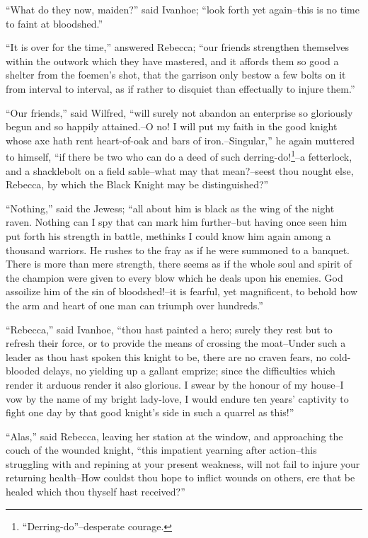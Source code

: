 ``What do they now, maiden?'' said Ivanhoe; ``look forth yet again--this
is no time to faint at bloodshed.''

``It is over for the time,'' answered Rebecca; ``our friends strengthen
themselves within the outwork which they have mastered, and it affords
them so good a shelter from the foemen's shot, that the garrison only
bestow a few bolts on it from interval to interval, as if rather to
disquiet than effectually to injure them.''

``Our friends,'' said Wilfred, ``will surely not abandon an enterprise
so gloriously begun and so happily attained.--O no! I will put my faith
in the good knight whose axe hath rent heart-of-oak and bars of
iron.--Singular,'' he again muttered to himself, ``if there be two who
can do a deed of such derring-do!\footnote{``Derring-do''--desperate
courage.}--a fetterlock, and a
shacklebolt on a field sable--what may that mean?--seest thou nought
else, Rebecca, by which the Black Knight may be distinguished?''

``Nothing,'' said the Jewess; ``all about him is black as the wing of
the night raven. Nothing can I spy that can mark him further--but having
once seen him put forth his strength in battle, methinks I could know
him again among a thousand warriors. He rushes to the fray as if he were
summoned to a banquet. There is more than mere strength, there seems as
if the whole soul and spirit of the champion were given to every blow
which he deals upon his enemies. God assoilize him of the sin of
bloodshed!--it is fearful, yet magnificent, to behold how the arm and
heart of one man can triumph over hundreds.''

``Rebecca,'' said Ivanhoe, ``thou hast painted a hero; surely they rest
but to refresh their force, or to provide the means of crossing the
moat--Under such a leader as thou hast spoken this knight to be, there
are no craven fears, no cold-blooded delays, no yielding up a gallant
emprize; since the difficulties which render it arduous render it also
glorious. I swear by the honour of my house--I vow by the name of my
bright lady-love, I would endure ten years' captivity to fight one day
by that good knight's side in such a quarrel as this!''

``Alas,'' said Rebecca, leaving her station at the window, and
approaching the couch of the wounded knight, ``this impatient yearning
after action--this struggling with and repining at your present
weakness, will not fail to injure your returning health--How couldst
thou hope to inflict wounds on others, ere that be healed which thou
thyself hast received?''

